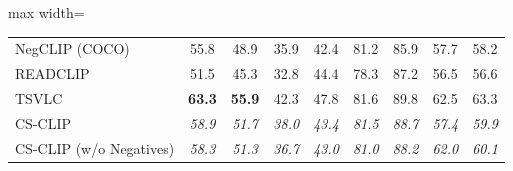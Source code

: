 \begin{table}[t]
\begin{adjustbox}{max width=\textwidth}
\begin{tabular}{lcccccccc}
    NegCLIP (COCO) & 55.8 & 48.9 & 35.9 & 42.4 & 81.2 & 85.9 & 57.7 & 58.2 \\
    READCLIP & 51.5 & 45.3 & 32.8 & 44.4 & 78.3 & 87.2 & 56.5 & 56.6 \\
    TSVLC & \textbf{63.3} & \textbf{55.9} & 42.3 & 47.8 & 81.6 & 89.8 & 62.5 & 63.3 \\
    \midrule
    CS-CLIP & \emph{58.9} & \emph{51.7} & \emph{38.0} & \emph{43.4} & \emph{81.5} & \emph{88.7} & \emph{57.4} & \emph{59.9} \\
    CS-CLIP (w/o Negatives) & \emph{58.3} & \emph{51.3} & \emph{36.7} & \emph{43.0} & \emph{81.0} & \emph{88.2} & \emph{62.0} & \emph{60.1} \\
    \bottomrule
  \end{tabular}
  \end{adjustbox}
\end{table}